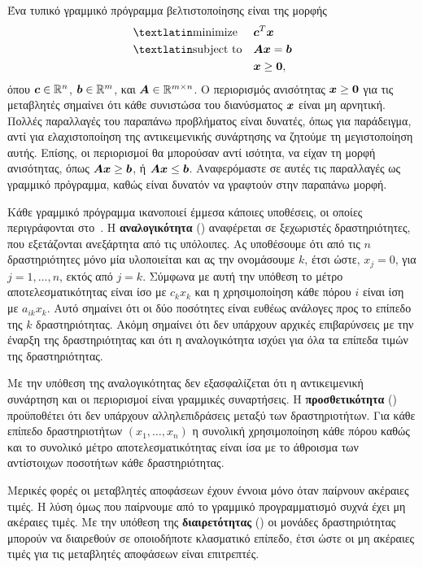 Ένα τυπικό γραμμικό πρόγραμμα βελτιστοποίησης είναι της μορφής
\begin{equation}\label{eq:lp_min}
    \begin{aligned}
        & {\text{\tl{minimize}}}
        & & \vc{c}^T \vc{x} \\
        & \text{\tl{subject to}}
        & & \mt{A} \vc{x} = \vc{b} \\
        &&& \vc{x} \ge \vc{0},
    \end{aligned}
\end{equation}
όπου $\bm{c} \in \mathbb{R}^n$, $\bm{b} \in \mathbb{R}^m$, και
$\boldsymbol{A} \in \mathbb{R}^{m \times n}$. Ο περιορισμός ανισότητας $\bm{x} \ge \bm{0}$
για τις μεταβλητές σημαίνει ότι κάθε συνιστώσα του διανύσματος $\bm{x}$
είναι μη αρνητική. Πολλές παραλλαγές του παραπάνω προβλήματος είναι δυνατές,
όπως για παράδειγμα, αντί για ελαχιστοποίηση της αντικειμενικής συνάρτησης να ζητούμε
τη μεγιστοποίηση αυτής. Επίσης, οι περιορισμοί θα μπορούσαν αντί ισότητα, να είχαν
τη μορφή ανισότητας, όπως $\boldsymbol{A}\bm{x} \ge \bm{b}$, ή $\boldsymbol{A}\bm{x} \le \bm{b}$.
Αναφερόμαστε σε αυτές τις παραλλαγές ως γραμμικό πρόγραμμα, καθώς είναι δυνατόν να γραφτούν στην παραπάνω μορφή.

Κάθε γραμμικό πρόγραμμα ικανοποιεί έμμεσα κάποιες υποθέσεις, οι οποίες περιγράφονται
στο~\cite{hillier1985}. Η \textbf{αναλογικότητα} () αναφέρεται σε
ξεχωριστές δραστηριότητες, που εξετάζονται ανεξάρτητα από τις υπόλοιπες.
Ας υποθέσουμε ότι από τις $n$ δραστηριότητες μόνο μία υλοποιείται και
ας την ονομάσουμε $k$,  έτσι ώστε, $x_j = 0$, για $j = 1, \ldots, n$, εκτός
από $j = k$. Σύμφωνα με αυτή την υπόθεση το μέτρο αποτελεσματικότητας
είναι ίσο με $c_k x_k$ και η χρησιμοποίηση κάθε πόρου $i$ είναι ίση
με $a_{ik}x_k$. Αυτό σημαίνει ότι οι δύο ποσότητες είναι ευθέως ανάλογες
προς το επίπεδο της $k$ δραστηριότητας. Ακόμη σημαίνει ότι δεν υπάρχουν
αρχικές επιβαρύνσεις με την έναρξη της δραστηριότητας και ότι η αναλογικότητα
ισχύει για όλα τα επίπεδα τιμών της δραστηριότητας.

Με την υπόθεση της αναλογικότητας δεν εξασφαλίζεται ότι η αντικειμενική συνάρτηση
και οι περιορισμοί είναι γραμμικές συναρτήσεις. Η \textbf{προσθετικότητα}
() προϋποθέτει ότι δεν υπάρχουν αλληλεπιδράσεις μεταξύ των
δραστηριοτήτων. Για κάθε επίπεδο δραστηριοτήτων $(x_1, \ldots, x_n)$ η
συνολική χρησιμοποίηση κάθε πόρου καθώς και το συνολικό μέτρο αποτελεσματικότητας
είναι ίσα με το άθροισμα των αντίστοιχων ποσοτήτων κάθε δραστηριότητας.

Μερικές φορές οι μεταβλητές αποφάσεων έχουν έννοια μόνο όταν παίρνουν
ακέραιες τιμές. Η λύση όμως που παίρνουμε από το γραμμικό προγραμματισμό
συχνά έχει μη ακέραιες τιμές. Με την υπόθεση της \textbf{διαιρετότητας}
() οι μονάδες δραστηριότητας μπορούν να διαιρεθούν σε
οποιοδήποτε κλασματικό επίπεδο, έτσι ώστε οι μη ακέραιες τιμές για τις μεταβλητές
αποφάσεων είναι επιτρεπτές.

